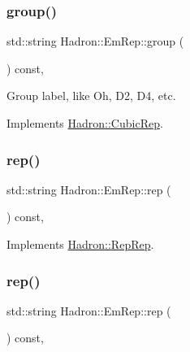\subsubsection{\texorpdfstring{group()}{group()}\hspace{0.1cm}{\footnotesize\ttfamily [3/3]}}
{\footnotesize\ttfamily std\+::string Hadron\+::\+Em\+Rep\+::group (\begin{DoxyParamCaption}{ }\end{DoxyParamCaption}) const\hspace{0.3cm}{\ttfamily [inline]}, {\ttfamily [virtual]}}

Group label, like Oh, D2, D4, etc. 

Implements \mbox{\hyperlink{structHadron_1_1CubicRep_a0748f11ec87f387062c8e8981339a29c}{Hadron\+::\+Cubic\+Rep}}.

\mbox{\label{structHadron_1_1EmRep_ab85c0592fa268cf31b803c3a128bbfa5}} 
\subsubsection{\texorpdfstring{rep()}{rep()}\hspace{0.1cm}{\footnotesize\ttfamily [1/5]}}
{\footnotesize\ttfamily std\+::string Hadron\+::\+Em\+Rep\+::rep (\begin{DoxyParamCaption}{ }\end{DoxyParamCaption}) const\hspace{0.3cm}{\ttfamily [inline]}, {\ttfamily [virtual]}}



Implements \mbox{\hyperlink{structHadron_1_1RepRep_ab3213025f6de249f7095892109575fde}{Hadron\+::\+Rep\+Rep}}.

\mbox{\label{structHadron_1_1EmRep_ab85c0592fa268cf31b803c3a128bbfa5}} 
\subsubsection{\texorpdfstring{rep()}{rep()}\hspace{0.1cm}{\footnotesize\ttfamily [2/5]}}
{\footnotesize\ttfamily std\+::string Hadron\+::\+Em\+Rep\+::rep (\begin{DoxyParamCaption}{ }\end{DoxyParamCaption}) const\hspace{0.3cm}{\ttfamily [inline]}, {\ttfamily [virtual]}}



